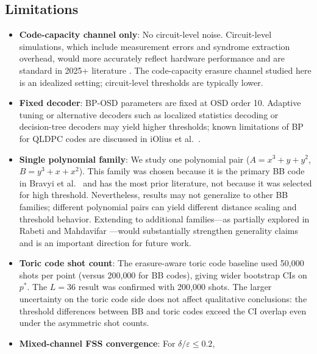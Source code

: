 \documentclass[a4paper]{quantumarticle}
\begin{document}
\subsection{Limitations}\label{sec:limitations}

\begin{itemize}
    \item \textbf{Code-capacity channel only}: No circuit-level noise. Circuit-level
          simulations, which include measurement errors and syndrome extraction overhead,
          would more accurately reflect hardware performance and are standard in 2025+
          literature \cite{berthusen2025local}. The code-capacity erasure channel studied
          here is an idealized setting; circuit-level thresholds are typically lower.
    \item \textbf{Fixed decoder}: BP-OSD parameters are fixed at OSD order 10. Adaptive
          tuning or alternative decoders such as localized statistics decoding
          \cite{hillmann2025lsd} or decision-tree decoders \cite{ott2025decision} may
          yield higher thresholds; known limitations of BP for QLDPC codes are discussed
          in iOlius et al.\ \cite{iolius2024bp}.
    \item \textbf{Single polynomial family}: We study one polynomial pair
          ($A = x^3 + y + y^2$, $B = y^3 + x + x^2$). This family was chosen because it
          is the primary BB code in Bravyi et al.\ \cite{bravyi2024high} and has the most
          prior literature, not because it was selected for high threshold.
          Nevertheless, results may not generalize to other BB families; different
          polynomial pairs can yield different distance scaling and threshold behavior.
          Extending to additional families---as partially explored in Rabeti and Mahdavifar
          \cite{rabeti2025bicycle}---would substantially strengthen generality claims
          and is an important direction for future work.
    \item \textbf{Toric code shot count}: The erasure-aware toric code baseline used 50{,}000
          shots per point (versus 200{,}000 for BB codes), giving wider bootstrap CIs on $p^*$.
          The $L=36$ result was confirmed with 200{,}000 shots.
          The larger uncertainty on the toric code side does not affect qualitative
          conclusions: the threshold differences between BB and toric codes exceed the CI
          overlap even under the asymmetric shot counts.
    \item \textbf{Mixed-channel FSS convergence}: For $\delta/\varepsilon \leq 0.2$,

\end{itemize}
\end{document}
